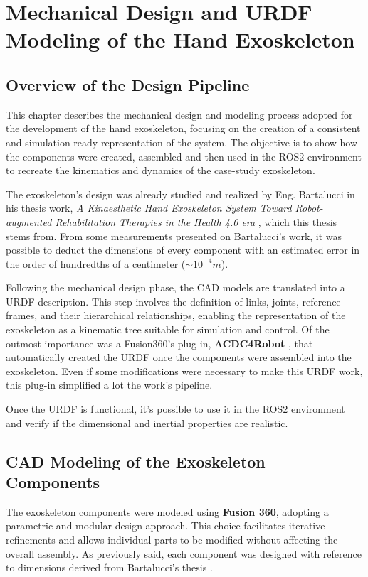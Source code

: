 \chapter{Mechanical Design and URDF Modeling of the Hand Exoskeleton}
\section{Overview of the Design Pipeline}
This chapter describes the mechanical design and modeling process adopted for the development of the hand exoskeleton, focusing on the creation of a consistent and simulation-ready representation of the system. The objective is to show how the components were created, assembled and then used in the ROS2 environment to recreate the kinematics and dynamics of the case-study exoskeleton.

The exoskeleton's design was already studied and realized by Eng. Bartalucci in his thesis work, \textit{A Kinaesthetic Hand Exoskeleton System Toward Robot-augmented Rehabilitation Therapies in the Health 4.0 era} \cite{Bartalucci2024_Exoskeleton}, which this thesis stems from. From some measurements presented on Bartalucci's work, it was possible to deduct the dimensions of every component with an estimated error in the order of hundredths of a centimeter ($\sim10^{-4}m$). 


Following the mechanical design phase, the CAD models are translated into a URDF description. This step involves the definition of links, joints, reference frames, and their hierarchical relationships, enabling the representation of the exoskeleton as a kinematic tree suitable for simulation and control. Of the outmost importance was a Fusion360's plug-in, \textbf{ACDC4Robot} \cite{ACDC4Robot}, that automatically created the URDF once the components were assembled into the exoskeleton. Even if some modifications were necessary to make this URDF work, this plug-in simplified a lot the work's pipeline.

Once the URDF is functional, it's possible to use it in the ROS2 environment and verify if the dimensional and inertial properties are realistic.

\section{CAD Modeling of the Exoskeleton Components}
The exoskeleton components were modeled using \textbf{Fusion 360}, adopting a parametric and modular design approach. This choice facilitates iterative refinements and allows individual parts to be modified without affecting the overall assembly. As previously said, each component was designed with reference to dimensions derived from Bartalucci's thesis \cite{Bartalucci2024_Exoskeleton}.

